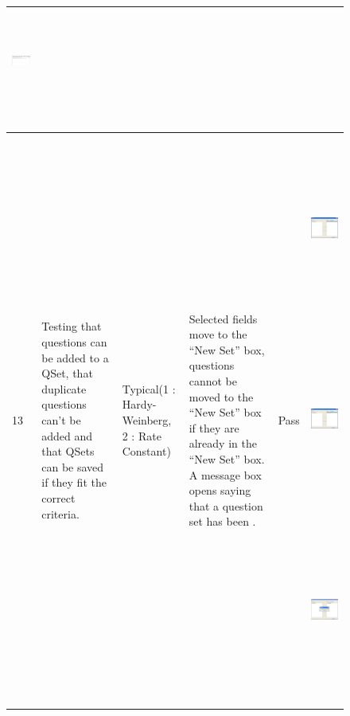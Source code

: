 \documentclass[letterpaper]{article}
\begin{document}
\begin{figure}[hbp]
\begin{minipage}{12.1146in}
\begin{flushleft}
\begin{supertabular}{|m{0.8913598in}|m{1.0997599in}|m{3.3018599in}|m{0.8809598in}|m{0.6198598in}|m{4.84626in}|}
 \includegraphics[width=2.6563in,height=1.3126in]{Tests_files/image018.jpg} 
{\color{black} ~}\\\hline
{\color{black} 13} &
{\color{black} Testing that questions can be added to a QSet, that duplicate questions can't be added and that QSets can
be saved if they fit the correct criteria.} &
{\color{black} Typical(1 : Hardy-Weinberg, 2 : Rate Constant)} &
{\color{black} Selected fields move to the ``New Set'' box, questions cannot be moved to the ``New Set'' box if they are
already in the ``New Set'' box. A message box opens saying that a question set has been .} &
{\color{black} Pass} &
 \includegraphics[width=3.2291in,height=2.448in]{Tests_files/image019.jpg} 
\includegraphics[width=3.2291in,height=2.4374in]{Tests_files/image020.jpg} 
\includegraphics[width=3.198in,height=2.448in]{Tests_files/image021.jpg} \\\hline

\end{supertabular}
\end{flushleft}
\end{minipage}
\end{figure}
\end{document}
